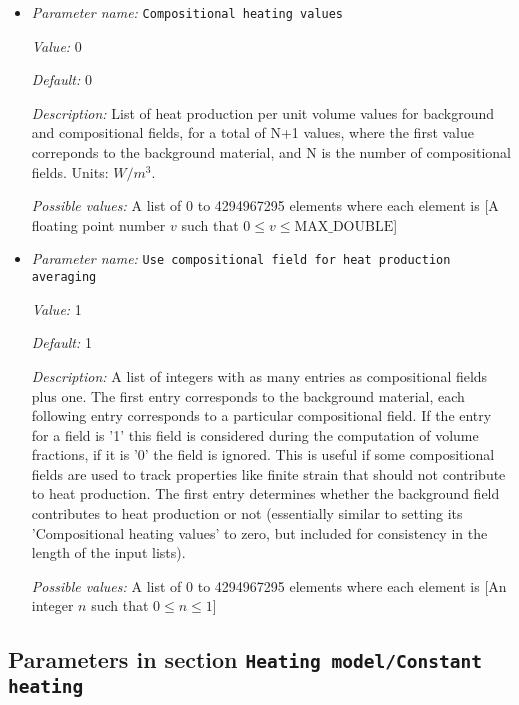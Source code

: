 \begin{itemize}
\item {\it Parameter name:} {\tt Compositional heating values}
\label{parameters:Heating model/Compositional heating/Compositional heating values}


{\it Value:} 0


{\it Default:} 0


{\it Description:} List of heat production per unit volume values for background and compositional fields, for a total of N+1 values, where the first value correponds to the background material, and N is the number of compositional fields. Units: $W/m^3$.


{\it Possible values:} A list of 0 to 4294967295 elements where each element is [A floating point number $v$ such that $0 \leq v \leq \text{MAX\_DOUBLE}$]
\item {\it Parameter name:} {\tt Use compositional field for heat production averaging}
\label{parameters:Heating model/Compositional heating/Use compositional field for heat production averaging}


{\it Value:} 1


{\it Default:} 1


{\it Description:} A list of integers with as many entries as compositional fields plus one. The first entry corresponds to the background material, each following entry corresponds to a particular compositional field. If the entry for a field is '1' this field is considered during the computation of volume fractions, if it is '0' the field is ignored. This is useful if some compositional fields are used to track properties like finite strain that should not contribute to heat production. The first entry determines whether the background field contributes to heat production or not (essentially similar to setting its 'Compositional heating values' to zero, but included for consistency in the length of the input lists).


{\it Possible values:} A list of 0 to 4294967295 elements where each element is [An integer $n$ such that $0\leq n \leq 1$]
\end{itemize}

\subsection{Parameters in section \tt Heating model/Constant heating}
\label{parameters:Heating_20model/Constant_20heating}

